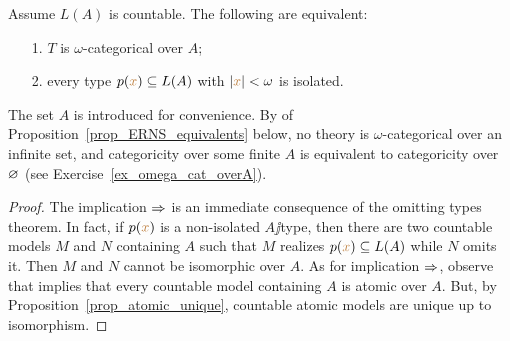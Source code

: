 \documentclass[creche.tex]{subfiles}
\begin{document}
\begin{theorem} Assume $L(A)$ is countable. The following are equivalent:
\begin{itemize}   
\item[1.] $T$ is $\omega$-categorical over $A$;
\item[2.] every type $p({\color{brown} x})\subseteq L(A)$ with $|{\color{brown} x}|<\omega$ is isolated. 
\end{itemize}
\end{theorem}
The set $A$ is introduced for convenience. By  of Proposition~\ref{prop_ERNS_equivalents} below, no theory is $\omega$-categorical over an infinite set, and categoricity over some finite $A$ is equivalent to categoricity over $\varnothing$ (see Exercise~\ref{ex_omega_cat_overA}).

\begin{proof} The implication $\Rightarrow$ is an immediate consequence of the omitting types theorem. In fact, if $p({\color{brown} x})$ is a non-isolated $A\jj$type, then there are two countable models $M$ and $N$ containing $A$ such that $M$ realizes $p({\color{brown} x})\subseteq L(A)$ while $N$ omits it. Then $M$ and $N$ cannot be isomorphic over $A$. As for implication $\Rightarrow$, observe that  implies that every countable model containing $A$ is atomic over $A$. But, by Proposition~\ref{prop_atomic_unique}, countable atomic models are unique up to isomorphism.
\end{proof}
\end{document}
